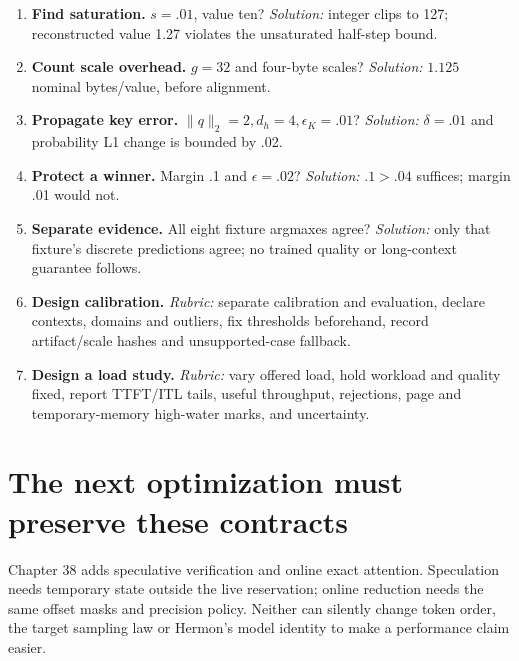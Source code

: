 \begin{enumerate}
\item \textbf{Find saturation.} $s=.01$, value ten?
\emph{Solution:} integer clips to 127; reconstructed value 1.27 violates
the unsaturated half-step bound.
\item \textbf{Count scale overhead.} $g=32$ and four-byte scales?
\emph{Solution:} $1.125$ nominal bytes/value, before alignment.
\item \textbf{Propagate key error.} $\|q\|_2=2,d_h=4,\epsilon_K=.01$?
\emph{Solution:} $\delta=.01$ and probability L1 change is bounded by .02.
\item \textbf{Protect a winner.} Margin .1 and $\epsilon=.02$?
\emph{Solution:} $.1>.04$ suffices; margin .01 would not.
\item \textbf{Separate evidence.} All eight fixture argmaxes agree?
\emph{Solution:} only that fixture's discrete predictions agree; no trained
quality or long-context guarantee follows.
\item \textbf{Design calibration.} \emph{Rubric:} separate calibration and
evaluation, declare contexts, domains and outliers, fix thresholds beforehand,
record artifact/scale hashes and unsupported-case fallback.
\item \textbf{Design a load study.} \emph{Rubric:} vary offered load, hold
workload and quality fixed, report TTFT/ITL tails, useful throughput,
rejections, page and temporary-memory high-water marks, and uncertainty.
\end{enumerate}

\section{The next optimization must preserve these contracts}
Chapter 38 adds speculative verification and online exact attention.
Speculation needs temporary state outside the live reservation; online
reduction needs the same offset masks and precision policy. Neither can
silently change token order, the target sampling law or Hermon's model
identity to make a performance claim easier.
